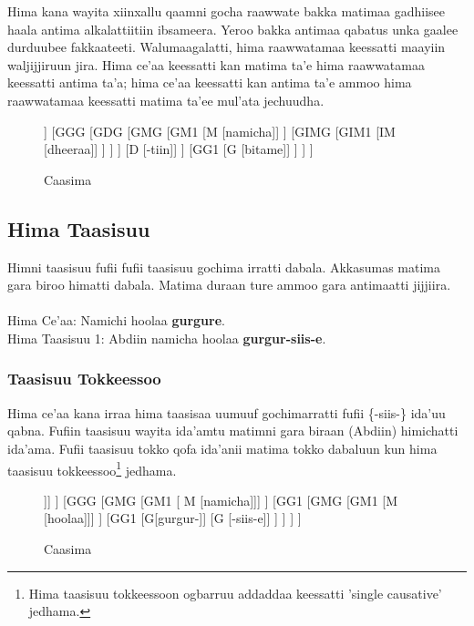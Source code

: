 \documentclass[11pt,b5paper]{book}
\begin{document}
Hima kana wayita xiinxallu qaamni gocha raawwate bakka matimaa gadhiisee haala antima alkalattiitiin ibsameera. Yeroo bakka antimaa qabatus unka gaalee durduubee fakkaateeti. Walumaagalatti, hima raawwatamaa keessatti maayiin waljijjiruun jira. Hima ce'aa keessatti kan matima ta'e hima raawwatamaa keessatti antima ta'a; hima ce'aa keessatti kan antima ta'e ammoo hima raawwatamaa keessatti matima ta'ee mul'ata jechuudha.

\begin{figure}[H]										
	\caption{Caasima}
	\centering
	\begin{forest}		
		[H		
			[GMG [f]]
			[GGG
				[GDG
					[GMG
						[GM1
							[M [namicha]]
						]
						[GIMG
							[GIM1
								[IM [dheeraa]]
							]
						]
					]
					[D [-tiin]]
				]
				[GG1
					[G [bitame]]
				]
			]		
		]		
	\end{forest}
\end{figure}



\subsection{Hima Taasisuu}

Himni taasisuu fufii fufii taasisuu gochima irratti dabala. Akkasumas matima gara biroo himatti dabala. Matima duraan ture ammoo gara antimaatti jijjiira.\\
\\
Hima Ce’aa: Namichi hoolaa \textbf{gurgure}.\\
Hima Taasisuu 1: Abdiin namicha hoolaa \textbf{gurgur-siis-e}. \\

\subsubsection{Taasisuu Tokkeessoo}
Hima ce'aa kana irraa hima taasisaa uumuuf gochimarratti fufii \{-siis-\} ida'uu qabna. Fufiin taasisuu wayita ida’amtu matimni gara biraan (Abdiin) himichatti ida’ama. Fufii taasisuu tokko qofa ida'anii matima tokko dabaluun kun hima taasisuu tokkeessoo\footnote{Hima taasisuu tokkeessoon  ogbarruu addaddaa keessatti 'single causative' jedhama.} jedhama. 

\begin{figure}[H]										
	\caption{Caasima}
	\centering
	\begin{forest}		
			[H
				[GMG
					[GM1 [M [Abdiin]]]
				]
				[GGG
					[GMG
						[GM1 [ M [namicha]]]
					]
					[GG1
						[GMG
							[GM1 [M [hoolaa]]]
						]
						[GG1
							[G[gurgur-]]
							[G [-siis-e]]
						]
					]					
				]
			]		
	\end{forest}
\end{figure}
\end{document}
